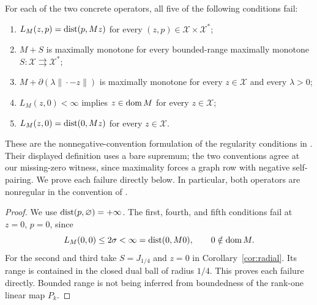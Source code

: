 \begin{corollary}\label{cor:regularity}
For each of the two concrete operators, all five of the following
conditions fail:
\begin{enumerate}
\item $L_M(z,p)=\operatorname{dist}(p,Mz)$ for every $(z,p)\in\mathcal X\times\mathcal X^*$;
\item $M+S$ is maximally monotone for every bounded-range maximally
monotone $S:\mathcal X\rightrightarrows\mathcal X^*$;
\item $M+\partial(\lambda\|\cdot-z\|)$ is maximally monotone for every
$z\in\mathcal X$ and every $\lambda>0$;
\item $L_M(z,0)<\infty$ implies $z\in\operatorname{dom} M$ for every $z\in\mathcal X$;
\item $L_M(z,0)=\operatorname{dist}(0,Mz)$ for every $z\in\mathcal X$.
\end{enumerate}
These are the nonnegative-convention formulation of the regularity
conditions in \cite[Theorem~2.3]{verona2012}. Their displayed definition
uses a bare supremum; the two conventions agree at our missing-zero
witness, since maximality forces a graph row with negative self-pairing.
We prove each failure directly below. In particular, both operators are
nonregular in the convention of \cite{verona2008}.
\end{corollary}
\begin{proof}
We use $\operatorname{dist}(p,\varnothing)=+\infty$. The first, fourth, and fifth
conditions fail at $z=0$, $p=0$, since
\[
L_M(0,0)\le2\sigma<\infty=\operatorname{dist}(0,M0),\qquad 0\notin\operatorname{dom} M.
\]
For the second and third take $S=J_{1/4}$ and $z=0$ in
Corollary~\ref{cor:radial}. Its range is contained in the closed dual
ball of radius $1/4$. This proves each failure directly. Bounded range
is not being inferred from boundedness of the rank-one linear map $P_k$.
\end{proof}

